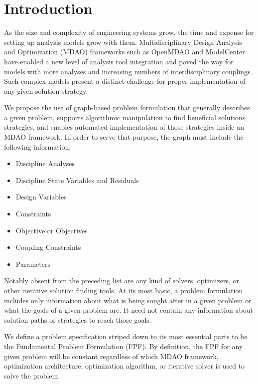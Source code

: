     \section{Introduction}
        
        As the size and complexity of engineering systems grow, the time and expense for setting up 
        analysis models grow with them. Multidisciplinary Design Analysis and Optimization (MDAO)
        frameworks such as OpenMDAO\cite{Gray2012} and ModelCenter have enabled a new level of analysis tool integration 
        and paved the way for models with more analyses and increasing numbers of interdisciplinary couplings. 
        Such complex models present a distinct challenge for proper implementation of any given solution strategy. 
        
        We propose the use of graph-based problem formulation that generally describes a
        given problem, supports algorithmic manipulation to find beneficial solutions strategies, and enables automated 
        implementation of those strategies inside an MDAO framework. In order to serve that purpose, the graph must include the following information: 
        \begin{itemize}
           \item Discipline Analyses 
           \item Discipline State Variables and Residuals
           \item Design Variables
           \item Constraints
           \item Objective or Objectives
           \item Coupling Constraints
           \item Parameters
        \end{itemize}
        Notably absent from the preceding list are any kind of solvers, optimizers, or other iterative solution finding tools. 
        At its most basic, a problem formulation includes only information about what is being sought after in a given problem or what the
        goals of a given problem are. It need not contain any information about solution paths or strategies to reach those goals. 

        We define a problem specification striped down to its most essential parts to be the 
        Fundamental Problem Formulation (FPF). By definition, the FPF for any given problem will be constant regardless 
        of which MDAO framework, optimization architecture, optimization algorithm, or iterative solver is used to solve the problem.

